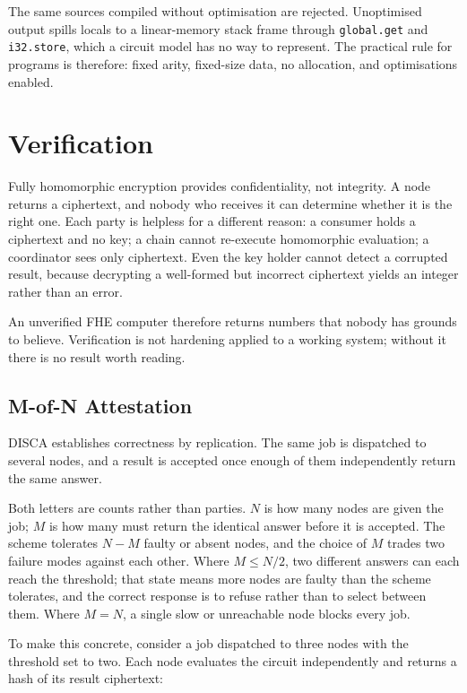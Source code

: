 \documentclass[12pt,a4paper]{article}
\begin{document}
The same sources compiled without optimisation are rejected.
Unoptimised output spills locals to a linear-memory stack frame through \texttt{global.get} and \texttt{i32.store}, which a circuit model has no way to represent.
The practical rule for programs is therefore: fixed arity, fixed-size data, no allocation, and optimisations enabled.

\section{Verification}

Fully homomorphic encryption provides confidentiality, not integrity.
A node returns a ciphertext, and nobody who receives it can determine whether it is the right one.
Each party is helpless for a different reason: a consumer holds a ciphertext and no key; a chain cannot re-execute homomorphic evaluation; a coordinator sees only ciphertext.
Even the key holder cannot detect a corrupted result, because decrypting a well-formed but incorrect ciphertext yields an integer rather than an error.

An unverified FHE computer therefore returns numbers that nobody has grounds to believe.
Verification is not hardening applied to a working system; without it there is no result worth reading.

\subsection{M-of-N Attestation}

DISCA establishes correctness by replication.
The same job is dispatched to several nodes, and a result is accepted once enough of them independently return the same answer.

Both letters are counts rather than parties.
$N$ is how many nodes are given the job; $M$ is how many must return the identical answer before it is accepted.
The scheme tolerates $N - M$ faulty or absent nodes, and the choice of $M$ trades two failure modes against each other.
Where $M \leq N/2$, two different answers can each reach the threshold; that state means more nodes are faulty than the scheme tolerates, and the correct response is to refuse rather than to select between them.
Where $M = N$, a single slow or unreachable node blocks every job.

To make this concrete, consider a job dispatched to three nodes with the threshold set to two.
Each node evaluates the circuit independently and returns a hash of its result ciphertext:
\end{document}
